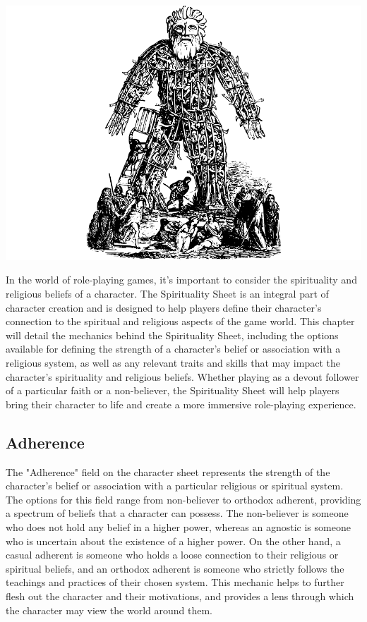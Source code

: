 \documentclass[12pt]{book}  %
\begin{document}
\begin{center}
    \includegraphics[width=\textwidth]{./images/religion01.pdf}
\end{center}

In the world of role-playing games, it's important to consider the spirituality and religious beliefs of a character. The Spirituality Sheet is an integral part of character creation and is designed to help players define their character's connection to the spiritual and religious aspects of the game world. This chapter will detail the mechanics behind the Spirituality Sheet, including the options available for defining the strength of a character's belief or association with a religious system, as well as any relevant traits and skills that may impact the character's spirituality and religious beliefs. Whether playing as a devout follower of a particular faith or a non-believer, the Spirituality Sheet will help players bring their character to life and create a more immersive role-playing experience.

\subsection{\textbf{Adherence}}

The "Adherence" field on the character sheet represents the strength of the character's belief or association with a particular religious or spiritual system. The options for this field range from non-believer to orthodox adherent, providing a spectrum of beliefs that a character can possess. The non-believer is someone who does not hold any belief in a higher power, whereas an agnostic is someone who is uncertain about the existence of a higher power. On the other hand, a casual adherent is someone who holds a loose connection to their religious or spiritual beliefs, and an orthodox adherent is someone who strictly follows the teachings and practices of their chosen system. This mechanic helps to further flesh out the character and their motivations, and provides a lens through which the character may view the world around them.
\end{document}
